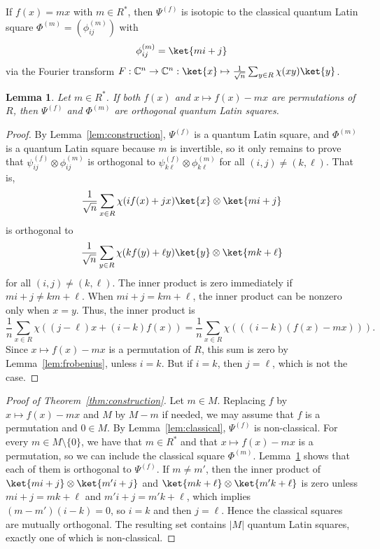 \documentclass[a4paper]{article}
\newtheorem{lemma}[theorem]{Lemma}
\theoremstyle{definition}
\newcommand{\CC}{\mathbb C}
\begin{document}
If \(f(x)=mx\) with \(m\in R^*\), then \(\Psi^{(f)}\) is isotopic to the classical quantum Latin square \(\Phi^{(m)}=(\phi_{ij}^{(m)})\) with \[\phi_{ij}^{(m)}=\ket{mi+j}\]
via the Fourier transform \(F:\CC^n\to\CC^n:\ket{x}\mapsto\frac1{\sqrt{n}}\sum_{y\in R}\chi(xy)\ket{y}\).

\begin{lemma}\label{lem:orthogonal}
Let \(m\in R^*\). If both \(f(x)\) and \(x\mapsto f(x)-mx\) are permutations of \(R\), then \(\Psi^{(f)}\) and \(\Phi^{(m)}\) are orthogonal quantum Latin squares.
\end{lemma}
\begin{proof}
    By Lemma~\ref{lem:construction}, \(\Psi^{(f)}\) is a quantum Latin square, and \(\Phi^{(m)}\) is a quantum Latin square because \(m\) is invertible, so it only remains to prove that \(\psi_{ij}^{(f)}\otimes\phi_{ij}^{(m)}\) is orthogonal to \(\psi_{k\ell}^{(f)}\otimes\phi_{k\ell}^{(m)}\) for all \((i,j)\neq(k,\ell)\). That is,
    \[\frac1{\sqrt{n}}\sum_{x\in R}\chi(if(x)+jx)\ket{x}\otimes\ket{mi+j}\]
    is orthogonal to
    \[\frac1{\sqrt{n}}\sum_{y\in R}\chi(kf(y)+\ell y)\ket{y}\otimes\ket{mk+\ell}\]
    for all \((i,j)\neq(k,\ell)\). The inner product is zero immediately if \(mi+j\neq km+\ell\). When \(mi+j=km+\ell\), the inner product can be nonzero only when \(x=y\). Thus, the inner product is
    \[\frac1n\sum_{x\in R}\chi((j-\ell)x+(i-k)f(x))=\frac1n\sum_{x\in R}\chi(((i-k)(f(x)-mx))).\]
    Since \(x\mapsto f(x)-mx\) is a permutation of \(R\), this sum is zero by Lemma~\ref{lem:frobenius}, unless \(i=k\). But if \(i=k\), then \(j=\ell\), which is not the case.
\end{proof}

\begin{proof}[Proof of Theorem~\ref{thm:construction}]
    Let \(m\in M\). Replacing \(f\) by \(x\mapsto f(x)-mx\) and \(M\) by \(M-m\) if needed, we may assume that \(f\) is a permutation and \(0\in M\). By Lemma~\ref{lem:classical}, \(\Psi^{(f)}\) is non-classical. For every \(m\in M\setminus\{0\}\), we have that \(m\in R^*\) and that \(x\mapsto f(x)-mx\) is a permutation, so we can include the classical square \(\Phi^{(m)}\). Lemma~\ref{lem:orthogonal} shows that each of them is orthogonal to \(\Psi^{(f)}\). If \(m\neq m'\), then the inner product of \(\ket{mi+j}\otimes\ket{m'i+j}\) and \(\ket{mk+\ell} \otimes \ket{m'k+\ell}\) is zero unless $mi+j=mk+\ell$ and $m'i+j=m'k+\ell$, which implies $(m-m')(i-k)=0$, so \(i=k\) and then $j=\ell$. Hence the classical squares are mutually orthogonal. The resulting set contains \(|M|\) quantum Latin squares, exactly one of which is non-classical.
\end{proof}
\end{document}
